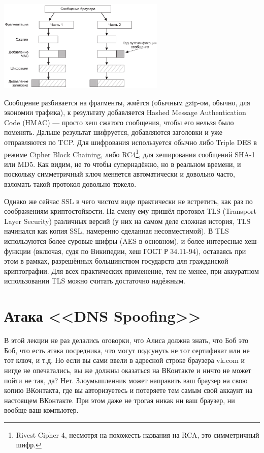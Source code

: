 \documentclass{../../text-style}
\begin{document}
\begin{center}
    \includegraphics[width=0.6\textwidth]{sslCommunication.png}
\end{center}

Сообщение разбивается на фрагменты, жмётся (обычным gzip-ом, обычно, для экономии трафика), к результату добавляется Hashed Message Authentication Code (HMAC) --- просто хеш сжатого сообщения, чтобы его нельзя было поменять. Дальше результат шифруется, добавляются заголовки и уже отправляются по TCP. Для шифрования используется обычно либо Triple DES в режиме Cipher Block Chaining, либо RC4\footnote{Rivest Cipher 4, несмотря на похожесть названия на RCA, это симметричный шифр.}, для хеширования сообщений SHA-1 или MD5. Как видим, не то чтобы супернадёжно, но в реальном времени, и поскольку симметричный ключ меняется автоматически и довольно часто, взломать такой протокол довольно тяжело.

Однако же сейчас SSL в чего чистом виде практически не встретить, как раз по соображениям криптостойкости. На смену ему пришёл протокол TLS (Transport Layer Security) различных версий (у них на самом деле сложная история, TLS начинался как копия SSL, намеренно сделанная несовместимой). В TLS используются более суровые шифры (AES в основном), и более интересные хеш-функции (включая, судя по Википедии, хеш ГОСТ Р 34.11-94), оставаясь при этом в рамках, разрешённых большинством государств для гражданской криптографии. Для всех практических применение, тем не менее, при аккуратном использовании TLS можно считать достаточно надёжным.

\section{Атака <<DNS Spoofing>>}

В этой лекции не раз делались оговорки, что Алиса должна знать, что Боб это Боб, что есть атака посредника, что могут подсунуть не тот сертификат или не тот ключ, и т.д. Но если вы сами ввели в адресной строке браузера vk.com и нигде не опечатались, вы же должны оказаться на ВКонтакте и ничто не может пойти не так, да? Нет. Злоумышленник может направить ваш браузер на свою копию ВКонтакта, где вы авторизуетесь и потеряете тем самым свой аккаунт на настоящем ВКонтакте. При этом даже не трогая никак ни ваш браузер, ни вообще ваш компьютер. 
\end{document}
